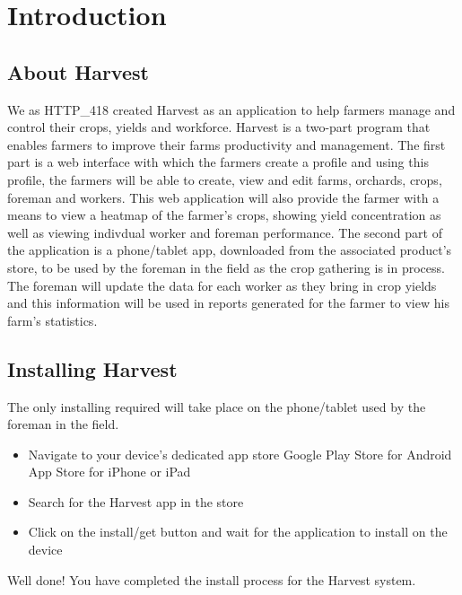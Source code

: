 \documentclass[11pt,fleqn]{book} %
\begin{document}

\chapter{Introduction}
	\section{About Harvest}
		We as HTTP\_418 created Harvest as an application to help farmers manage and control their crops, yields and workforce. Harvest is a two-part program that enables farmers to improve their farms productivity and management. The first part is a web interface with which the farmers create a profile and using this profile, the farmers will be able to create, view and edit farms, orchards, crops, foreman and workers. This web application will also provide the farmer with a means to view a heatmap of the farmer's crops, showing yield concentration as well as viewing indivdual worker and foreman performance. The second part of the application is a phone/tablet app, downloaded from the associated product's store, to be used by the foreman in the field as the crop gathering is in process. The foreman will update the data for each worker as they bring in crop yields and this information will be used in reports generated for the farmer to view his farm's statistics.
	\section{Installing Harvest}
		The only installing required will take place on the phone/tablet used by the foreman in the field.
		\begin{itemize}
			\item Navigate to your device's dedicated app store
				\subitem Google Play Store for Android
				\subitem App Store for iPhone or iPad
			\item Search for the Harvest app in the store
			\item Click on the install/get button and wait for the application to install on the device
		\end{itemize}
		Well done! You have completed the install process for the Harvest system.
\end{document}
